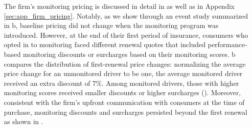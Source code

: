 The firm's monitoring pricing is discussed in detail in  as well as in Appendix \ref{sec:app_firm_pricing}. Notably, as we show through an event study summarized in b, baseline pricing did not change when the monitoring program was introduced. However, at the end of their first period of insurance, consumers who opted in to monitoring faced different renewal quotes that included performance-based monitoring discounts or surcharges based on their monitoring scores. b compares the distribution of first-renewal price changes: normalizing the average price change for an unmonitored driver to be one, the average monitored driver received an extra discount of 7\%. Among monitored drivers, those with higher monitoring scores received smaller discounts or higher surcharges (). Moreover, consistent with the firm's upfront communication with consumers at the time of purchase, monitoring discounts and surcharges persisted beyond the first renewal as shown in .
\vspace{0.5cm}
